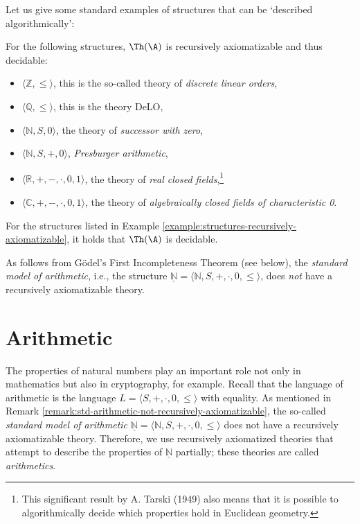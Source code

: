 Let us give some standard examples of structures that can be `described algorithmically':

\begin{example}\label{example:structures-recursively-axiomatizable}
For the following structures, $\Th(\A)$ is recursively axiomatizable and thus decidable:

\begin{itemize}
    \item $\langle \mathbb{Z}, \leq \rangle$, this is the so-called theory of \emph{discrete linear orders},        
    \item $\langle \mathbb{Q}, \leq \rangle$, this is the theory DeLO,
    \item $\langle \mathbb{N}, S, 0 \rangle$, the theory of \emph{successor with zero},
    \item $\langle \mathbb{N}, S, +, 0 \rangle$, \emph{Presburger arithmetic},
    \item $\langle \mathbb{R}, +, -, \cdot, 0, 1 \rangle$, the theory of \emph{real closed fields},\footnote{This significant result by A. Tarski (1949) also means that it is possible to algorithmically decide which properties hold in Euclidean geometry.}
    \item $\langle \mathbb{C}, +, -, \cdot, 0, 1 \rangle$, the theory of \emph{algebraically closed fields of characteristic 0}.
\end{itemize}
\end{example}
   
\begin{corollary}
    For the structures listed in Example \ref{example:structures-recursively-axiomatizable}, it holds that $\Th(\A)$ is decidable.
\end{corollary}


\begin{remark}\label{remark:std-arithmetic-not-recursively-axiomatizable}
    As follows from Gödel's First Incompleteness Theorem (see below), the \emph{standard model of arithmetic}, i.e., the structure $\underline{\mathbb{N}} = \langle \mathbb{N}, S, +, \cdot, 0, \leq \rangle$, does \emph{not} have a recursively axiomatizable theory.
\end{remark}


\section{Arithmetic}

The properties of natural numbers play an important role not only in mathematics but also in cryptography, for example. Recall that the language of arithmetic is the language $L = \langle S, +, \cdot, 0, \leq \rangle$ with equality. As mentioned in Remark \ref{remark:std-arithmetic-not-recursively-axiomatizable}, the so-called \emph{standard model of arithmetic} $\underline{\mathbb{N}} = \langle \mathbb{N}, S, +, \cdot, 0, \leq \rangle$ does not have a recursively axiomatizable theory. Therefore, we use recursively axiomatized theories that attempt to describe the properties of $\underline{\mathbb{N}}$ partially; these theories are called \emph{arithmetics}.

